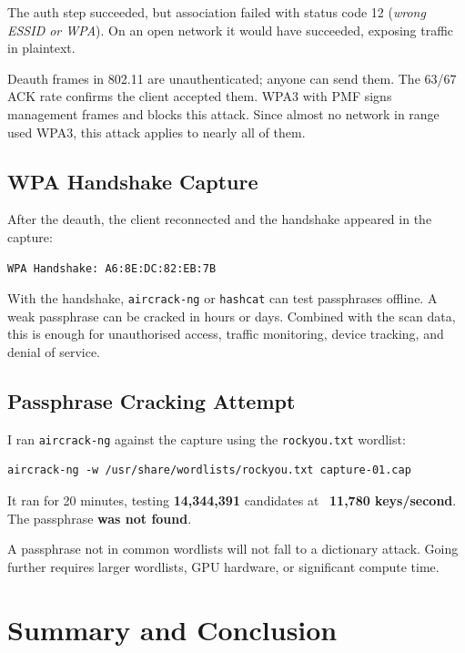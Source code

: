 \documentclass[12pt,a4paper]{article}
\begin{document}
The auth step succeeded, but association failed with status code 12 (\emph{wrong ESSID or WPA}). On an open network it would have succeeded, exposing traffic in plaintext.

Deauth frames in 802.11 are unauthenticated; anyone can send them. The 63/67 ACK rate confirms the client accepted them. WPA3 with PMF signs management frames and blocks this attack. Since almost no network in range used WPA3, this attack applies to nearly all of them.

\subsection{WPA Handshake Capture}

After the deauth, the client reconnected and the handshake appeared in the capture:

\begin{lstlisting}
WPA Handshake: A6:8E:DC:82:EB:7B
\end{lstlisting}

With the handshake, \texttt{aircrack-ng} or \texttt{hashcat} can test passphrases offline. A weak passphrase can be cracked in hours or days. Combined with the scan data, this is enough for unauthorised access, traffic monitoring, device tracking, and denial of service.

\subsection{Passphrase Cracking Attempt}

I ran \texttt{aircrack-ng} against the capture using the \texttt{rockyou.txt} wordlist:

\begin{lstlisting}
aircrack-ng -w /usr/share/wordlists/rockyou.txt capture-01.cap
\end{lstlisting}

It ran for 20 minutes, testing \textbf{14,344,391} candidates at ~\textbf{11,780 keys/second}. The passphrase \textbf{was not found}.

A passphrase not in common wordlists will not fall to a dictionary attack. Going further requires larger wordlists, GPU hardware, or significant compute time.

\section{Summary and Conclusion}
\end{document}

